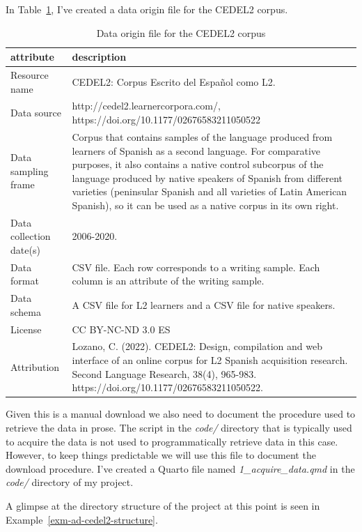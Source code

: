 \documentclass[
  letterpaper,
  DIV=11,
  numbers=noendperiod]{scrreport}
\theoremstyle{definition}
\theoremstyle{remark}
\begin{document}
In Table~\ref{tbl-ad-cedel2-do}, I've created a data origin file for the
CEDEL2 corpus.

\hypertarget{tbl-ad-cedel2-do}{}
\begin{table}
\caption{\label{tbl-ad-cedel2-do}Data origin file for the CEDEL2 corpus }\tabularnewline

\centering
\begin{tabular}{ll}
\toprule
attribute & description\\
\midrule
Resource name & CEDEL2: Corpus Escrito del Español como L2.\\
Data source & http://cedel2.learnercorpora.com/, https://doi.org/10.1177/02676583211050522\\
Data sampling frame & Corpus that contains samples of the language produced from learners of Spanish as a second language. For comparative purposes, it also contains a native control subcorpus of the language produced by native speakers of Spanish from different varieties (peninsular Spanish and all varieties of Latin American Spanish), so it can be used as a native corpus in its own right.\\
Data collection date(s) & 2006-2020.\\
Data format & CSV file. Each row corresponds to a writing sample. Each column is an attribute of the writing sample.\\
\addlinespace
Data schema & A CSV file for L2 learners and a CSV file for native speakers.\\
License & CC BY-NC-ND 3.0 ES\\
Attribution & Lozano, C. (2022). CEDEL2: Design, compilation and web interface of an online corpus for L2 Spanish acquisition research. Second Language Research, 38(4), 965-983. https://doi.org/10.1177/02676583211050522.\\
\bottomrule
\end{tabular}
\end{table}

Given this is a manual download we also need to document the procedure
used to retrieve the data in prose. The script in the \emph{code/}
directory that is typically used to acquire the data is not used to
programmatically retrieve data in this case. However, to keep things
predictable we will use this file to document the download procedure.
I've created a Quarto file named \emph{1\_acquire\_data.qmd} in the
\emph{code/} directory of my project.

A glimpse at the directory structure of the project at this point is
seen in Example~\ref{exm-ad-cedel2-structure}.
\end{document}
